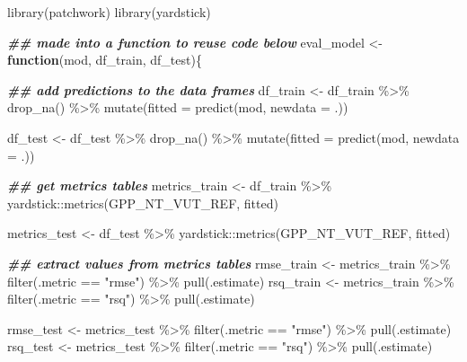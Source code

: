 \documentclass[
]{book}
\newenvironment{Shaded}{\begin{snugshade}}{\end{snugshade}}
\newcommand{\AttributeTok}[1]{\textcolor[rgb]{0.77,0.63,0.00}{#1}}
\newcommand{\ControlFlowTok}[1]{\textcolor[rgb]{0.13,0.29,0.53}{\textbf{#1}}}
\newcommand{\DocumentationTok}[1]{\textcolor[rgb]{0.56,0.35,0.01}{\textbf{\textit{#1}}}}
\newcommand{\FunctionTok}[1]{\textcolor[rgb]{0.00,0.00,0.00}{#1}}
\newcommand{\NormalTok}[1]{#1}
\newcommand{\OtherTok}[1]{\textcolor[rgb]{0.56,0.35,0.01}{#1}}
\newcommand{\SpecialCharTok}[1]{\textcolor[rgb]{0.00,0.00,0.00}{#1}}
\newcommand{\StringTok}[1]{\textcolor[rgb]{0.31,0.60,0.02}{#1}}
\begin{document}
\begin{Shaded}
\begin{Highlighting}[]
\FunctionTok{library}\NormalTok{(patchwork)}
\FunctionTok{library}\NormalTok{(yardstick)}

\DocumentationTok{\#\# made into a function to reuse code below}
\NormalTok{eval\_model }\OtherTok{\textless{}{-}} \ControlFlowTok{function}\NormalTok{(mod, df\_train, df\_test)\{}
  
  \DocumentationTok{\#\# add predictions to the data frames}
\NormalTok{  df\_train }\OtherTok{\textless{}{-}}\NormalTok{ df\_train }\SpecialCharTok{\%\textgreater{}\%} 
    \FunctionTok{drop\_na}\NormalTok{() }\SpecialCharTok{\%\textgreater{}\%} 
    \FunctionTok{mutate}\NormalTok{(}\AttributeTok{fitted =}  \FunctionTok{predict}\NormalTok{(mod, }\AttributeTok{newdata =}\NormalTok{ .))}
  
\NormalTok{  df\_test }\OtherTok{\textless{}{-}}\NormalTok{ df\_test }\SpecialCharTok{\%\textgreater{}\%} 
    \FunctionTok{drop\_na}\NormalTok{() }\SpecialCharTok{\%\textgreater{}\%} 
    \FunctionTok{mutate}\NormalTok{(}\AttributeTok{fitted =}  \FunctionTok{predict}\NormalTok{(mod, }\AttributeTok{newdata =}\NormalTok{ .))}
  
  \DocumentationTok{\#\# get metrics tables}
\NormalTok{  metrics\_train }\OtherTok{\textless{}{-}}\NormalTok{ df\_train }\SpecialCharTok{\%\textgreater{}\%} 
\NormalTok{    yardstick}\SpecialCharTok{::}\FunctionTok{metrics}\NormalTok{(GPP\_NT\_VUT\_REF, fitted)}
  
\NormalTok{  metrics\_test }\OtherTok{\textless{}{-}}\NormalTok{ df\_test }\SpecialCharTok{\%\textgreater{}\%} 
\NormalTok{    yardstick}\SpecialCharTok{::}\FunctionTok{metrics}\NormalTok{(GPP\_NT\_VUT\_REF, fitted)}
  
  \DocumentationTok{\#\# extract values from metrics tables}
\NormalTok{  rmse\_train }\OtherTok{\textless{}{-}}\NormalTok{ metrics\_train }\SpecialCharTok{\%\textgreater{}\%} 
    \FunctionTok{filter}\NormalTok{(.metric }\SpecialCharTok{==} \StringTok{"rmse"}\NormalTok{) }\SpecialCharTok{\%\textgreater{}\%} 
    \FunctionTok{pull}\NormalTok{(.estimate)}
\NormalTok{  rsq\_train }\OtherTok{\textless{}{-}}\NormalTok{ metrics\_train }\SpecialCharTok{\%\textgreater{}\%} 
    \FunctionTok{filter}\NormalTok{(.metric }\SpecialCharTok{==} \StringTok{"rsq"}\NormalTok{) }\SpecialCharTok{\%\textgreater{}\%} 
    \FunctionTok{pull}\NormalTok{(.estimate)}
  
\NormalTok{  rmse\_test }\OtherTok{\textless{}{-}}\NormalTok{ metrics\_test }\SpecialCharTok{\%\textgreater{}\%} 
    \FunctionTok{filter}\NormalTok{(.metric }\SpecialCharTok{==} \StringTok{"rmse"}\NormalTok{) }\SpecialCharTok{\%\textgreater{}\%} 
    \FunctionTok{pull}\NormalTok{(.estimate)}
\NormalTok{  rsq\_test }\OtherTok{\textless{}{-}}\NormalTok{ metrics\_test }\SpecialCharTok{\%\textgreater{}\%} 
    \FunctionTok{filter}\NormalTok{(.metric }\SpecialCharTok{==} \StringTok{"rsq"}\NormalTok{) }\SpecialCharTok{\%\textgreater{}\%} 
    \FunctionTok{pull}\NormalTok{(.estimate)}
  

\end{Highlighting}
\end{Shaded}
\end{document}
